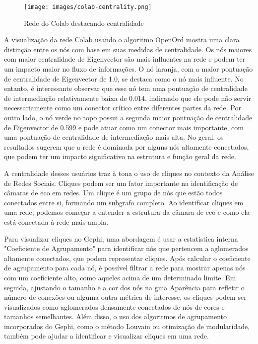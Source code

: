 \begin{figure}[!hbtp]
	\caption{Rede do Colab destacando centralidade}
	\label{fig:colab_centrality}
	\centering
	\texttt{[image: images/colab-centrality.png]}
	\fautor
\end{figure}

A visualização da rede Colab usando o algoritmo OpenOrd mostra uma clara distinção entre os nós com base em suas medidas de centralidade. Os nós maiores com maior centralidade de Eigenvector são mais influentes na rede e podem ter um impacto maior no fluxo de informações. O nó laranja, com a maior pontuação de centralidade de Eigenvector de 1.0, se destaca como o nó mais influente. No entanto, é interessante observar que esse nó tem uma pontuação de centralidade de intermediação relativamente baixa de 0.014, indicando que ele pode não servir necessariamente como um conector crítico entre diferentes partes da rede. Por outro lado, o nó verde no topo possui a segunda maior pontuação de centralidade de Eigenvector de 0.599 e pode atuar como um conector mais importante, com uma pontuação de centralidade de intermediação mais alta. No geral, os resultados sugerem que a rede é dominada por alguns nós altamente conectados, que podem ter um impacto significativo na estrutura e função geral da rede.

A centralidade desses usuários traz à tona o uso de cliques no contexto da Análise de Redes Sociais. Cliques podem ser um fator importante na identificação de câmaras de eco em redes. Um clique é um grupo de nós que estão todos conectados entre si, formando um subgrafo completo. Ao identificar cliques em uma rede, podemos começar a entender a estrutura da câmara de eco e como ela está conectada à rede mais ampla.

Para visualizar cliques no Gephi, uma abordagem é usar a estatística interna "Coeficiente de Agrupamento" para identificar nós que pertencem a aglomerados altamente conectados, que podem representar cliques. Após calcular o coeficiente de agrupamento para cada nó, é possível filtrar a rede para mostrar apenas nós com um coeficiente alto, como aqueles acima de um determinado limite. Em seguida, ajustando o tamanho e a cor dos nós na guia Aparência para refletir o número de conexões ou alguma outra métrica de interesse, os cliques podem ser visualizados como aglomerados densamente conectados de nós de cores e tamanhos semelhantes. Além disso, o uso dos algoritmos de agrupamento incorporados do Gephi, como o método Louvain ou otimização de modularidade, também pode ajudar a identificar e visualizar cliques em uma rede.

